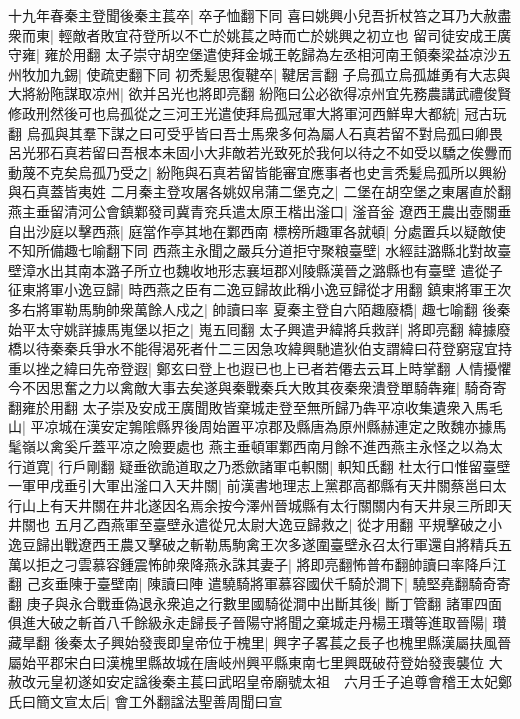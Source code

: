十九年春秦主登聞後秦主萇卒|{
	卒子恤翻下同}
喜曰姚興小兒吾折杖笞之耳乃大赦盡衆而東|{
	輕敵者敗宜苻登所以不亡於姚萇之時而亡於姚興之初立也}
留司徒安成王廣守雍|{
	雍於用翻}
太子崇守胡空堡遣使拜金城王乾歸為左丞相河南王領秦梁益凉沙五州牧加九錫|{
	使疏吏翻下同}
初秃髪思復鞬卒|{
	鞬居言翻}
子烏孤立烏孤雄勇有大志與大將紛陁謀取凉州|{
	欲并呂光也將即亮翻}
紛陁曰公必欲得凉州宜先務農講武禮俊賢修政刑然後可也烏孤從之三河王光遣使拜烏孤冠軍大將軍河西鮮卑大都統|{
	冠古玩翻}
烏孤與其羣下謀之曰可受乎皆曰吾士馬衆多何為屬人石真若留不對烏孤曰卿畏呂光邪石真若留曰吾根本未固小大非敵若光致死於我何以待之不如受以驕之俟釁而動蔑不克矣烏孤乃受之|{
	紛陁與石真若留皆能審宜應事者也史言秃髪烏孤所以興紛與石真蓋皆夷姓}
二月秦主登攻屠各姚奴帛蒲二堡克之|{
	二堡在胡空堡之東屠直於翻}
燕主垂留清河公會鎮鄴發司冀青兖兵遣太原王楷出滏口|{
	滏音釡}
遼西王農出壺關垂自出沙庭以擊西燕|{
	庭當作亭其地在鄴西南}
標榜所趣軍各就頓|{
	分處置兵以疑敵使不知所備趣七喻翻下同}
西燕主永聞之嚴兵分道拒守聚粮臺壁|{
	水經註潞縣北對故臺壁漳水出其南本潞子所立也魏收地形志襄垣郡刈陵縣漢晉之潞縣也有臺壁}
遣從子征東將軍小逸豆歸|{
	時西燕之臣有二逸豆歸故此稱小逸豆歸從才用翻}
鎮東將軍王次多右將軍勒馬駒帥衆萬餘人戍之|{
	帥讀曰率}
夏秦主登自六陌趣廢橋|{
	趣七喻翻}
後秦始平太守姚詳據馬嵬堡以拒之|{
	嵬五囘翻}
太子興遣尹緯將兵救詳|{
	將即亮翻}
緯據廢橋以待秦秦兵爭水不能得渴死者什二三因急攻緯興馳遣狄伯支謂緯曰苻登窮寇宜持重以挫之緯曰先帝登遐|{
	鄭玄曰登上也遐已也上已者若僊去云耳上時掌翻}
人情擾懼今不因思奮之力以禽敵大事去矣遂與秦戰秦兵大敗其夜秦衆潰登單騎犇雍|{
	騎奇寄翻雍於用翻}
太子崇及安成王廣聞敗皆棄城走登至無所歸乃犇平凉收集遺衆入馬毛山|{
	平凉城在漢安定鶉隂縣界後周始置平凉郡及縣唐為原州縣赫連定之敗魏亦據馬髦嶺以禽奚斤蓋平凉之險要處也}
燕主垂頓軍鄴西南月餘不進西燕主永怪之以為太行道寛|{
	行戶剛翻}
疑垂欲詭道取之乃悉歛諸軍屯軹關|{
	軹知氏翻}
杜太行口惟留臺壁一軍甲戌垂引大軍出滏口入天井關|{
	前漢書地理志上黨郡高都縣有天井關蔡邕曰太行山上有天井關在井北遂因名焉余按今澤州晉城縣有太行關關内有天井泉三所即天井關也}
五月乙酉燕軍至臺壁永遣從兄太尉大逸豆歸救之|{
	從才用翻}
平規擊破之小逸豆歸出戰遼西王農又擊破之斬勒馬駒禽王次多遂圍臺壁永召太行軍還自將精兵五萬以拒之刁雲慕容鍾震怖帥衆降燕永誅其妻子|{
	將即亮翻怖普布翻帥讀曰率降戶江翻}
己亥垂陳于臺壁南|{
	陳讀曰陣}
遣驍騎將軍慕容國伏千騎於澗下|{
	驍堅堯翻騎奇寄翻}
庚子與永合戰垂偽退永衆追之行數里國騎從澗中出斷其後|{
	斷丁管翻}
諸軍四面俱進大破之斬首八千餘級永走歸長子晉陽守將聞之棄城走丹楊王瓚等進取晉陽|{
	瓚藏旱翻}
後秦太子興始發喪即皇帝位于槐里|{
	興字子畧萇之長子也槐里縣漢屬扶風晉屬始平郡宋白曰漢槐里縣故城在唐岐州興平縣東南七里興既破苻登始發喪襲位}
大赦改元皇初遂如安定諡後秦主萇曰武昭皇帝廟號太祖　六月壬子追尊會稽王太妃鄭氏曰簡文宣太后|{
	會工外翻諡法聖善周聞曰宣}
